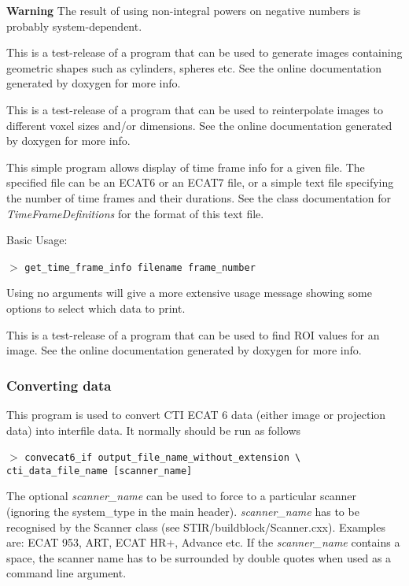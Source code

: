 \documentclass{article}
\newcommand{\cmdline}[1]{\par \noindent $>$ \texttt{#1}\par}
\begin{document}
\textbf{Warning} The result of using non-integral powers on negative 
numbers is probably system-dependent.

{ 
}

This is a test-release of a program that can be used to generate 
images containing geometric shapes such as cylinders, spheres 
etc. See the online documentation generated by doxygen for more 
info.

{ 
}

This is a test-release of a program that can be used to reinterpolate 
images to different voxel sizes and/or dimensions. See the online 
documentation generated by doxygen for more info.

{ 
}
\label{sec:get_time_frame_info}
This simple program allows display of time frame info for a given 
file. The specified file can be an ECAT6 or an ECAT7 file, or 
a simple text file specifying the number of time frames and their 
durations. See the class documentation for \textit{TimeFrameDefinitions} 
for the format of this text file.


\noindent
Basic Usage:
\cmdline{get\_time\_frame\_info filename frame\_number}


Using no arguments will give a more extensive usage message showing 
some options to select which data to print.

{ 
}

This is a test-release of a program that can be used to find 
ROI values for an image. See the online documentation generated 
by doxygen for more info.


\subsubsection{
Converting data}
\label{sec:convertingdata}
This program is used to convert CTI ECAT 6 data (either image 
or projection data) into interfile data. It normally should be 
run as follows
\cmdline{convecat6\_if output\_file\_name\_without\_extension {\textbackslash}\\
cti\_data\_file\_name [scanner\_name]}


The optional \textit{scanner\_name} can be used to force to a particular 
scanner (ignoring the system\_type in the main header). \textit{scanner\_name} 
has to be recognised by the Scanner class (see STIR/buildblock/Scanner.cxx). 
Examples are: ECAT 953, ART, ECAT HR+, Advance etc. If the \textit{scanner\_name} 
contains a space, the scanner name has to be surrounded by double 
quotes  when used as a command line argument.
\end{document}
